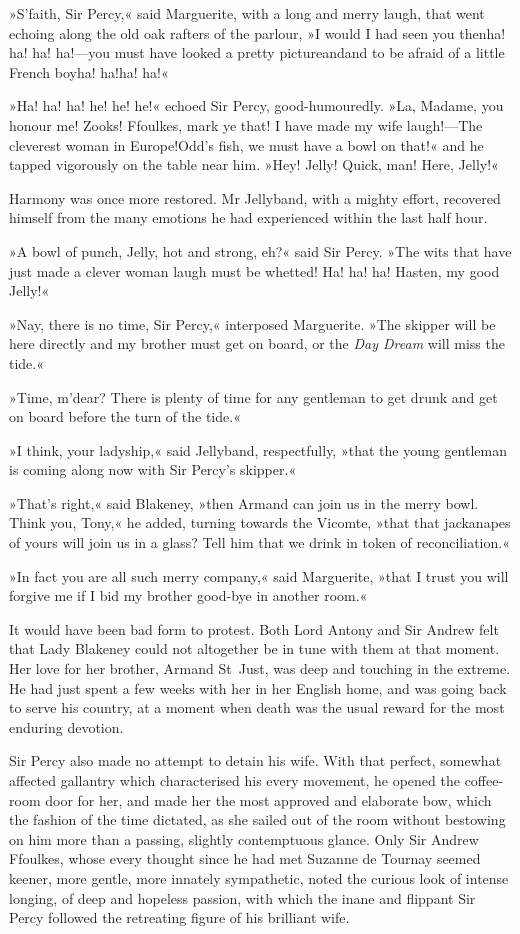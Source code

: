 »S'faith, Sir Percy,« said Marguerite, with a long and merry laugh, that went echoing along the old oak rafters of the parlour, »I would I had seen you then\textellipsis \allowbreak  ha! ha! ha! ha!—you must have looked a pretty picture\textellipsis \allowbreak  and\textellipsis \allowbreak  and to be afraid of a little French boy\textellipsis \allowbreak  ha! ha!\textellipsis \allowbreak  ha! ha!«

»Ha! ha! ha! he! he! he!« echoed Sir Percy, good-humouredly. »La, Madame, you honour me! Zooks!  Ffoulkes, mark ye that! I have made my wife laugh!—The cleverest woman in Europe!\textellipsis \allowbreak  \allowbreak Odd's fish, we must have a bowl on that!« and he tapped vigorously on the table near him. »Hey! Jelly! Quick, man! Here, Jelly!«

Harmony was once more restored. Mr Jellyband, with a mighty effort, recovered himself from the many emotions he had experienced within the last half hour.

»A bowl of punch, Jelly, hot and strong, eh?« said Sir Percy. »The wits that have just made a clever woman laugh must be whetted! Ha! ha! ha! Hasten, my good Jelly!«

»Nay, there is no time, Sir Percy,« interposed Marguerite. »The skipper will be here directly and my brother must get on board, or the \textit{Day Dream} will miss the tide.«

»Time, m'dear? There is plenty of time for any gentleman to get drunk and get on board before the turn of the tide.«

»I think, your ladyship,« said Jellyband, respectfully, »that the young gentleman is coming along now with Sir Percy's skipper.«

»That's right,« said Blakeney, »then Armand can join us in the merry bowl. Think you, Tony,« he added, turning towards the Vicomte, »that that jackanapes of yours will join us in a glass? Tell him that we drink in token of reconciliation.«

»In fact you are all such merry company,« said Marguerite, »that I trust you will forgive me if I bid my brother good-bye in another room.«

It would have been bad form to protest. Both Lord Antony and Sir Andrew felt that Lady Blakeney could not altogether be in tune with them at that moment. Her love for her brother, Armand St~Just, was deep and touching in the extreme. He had just spent a few weeks with her in her English home, and was going back to serve his country, at a moment when death was the usual reward for the most enduring devotion.

Sir Percy also made no attempt to detain his wife. With that perfect, somewhat affected gallantry which characterised his every movement, he opened the coffee-room door for her, and made her the most approved and elaborate bow, which the fashion of the time dictated, as she sailed out of the room without bestowing on him more than a passing, slightly contemptuous glance. Only Sir Andrew Ffoulkes, whose every thought since he had met Suzanne de Tournay seemed keener, more gentle, more innately sympathetic, noted the curious look of intense longing, of deep and hopeless passion, with which the inane and flippant Sir Percy followed the retreating figure of his brilliant wife.